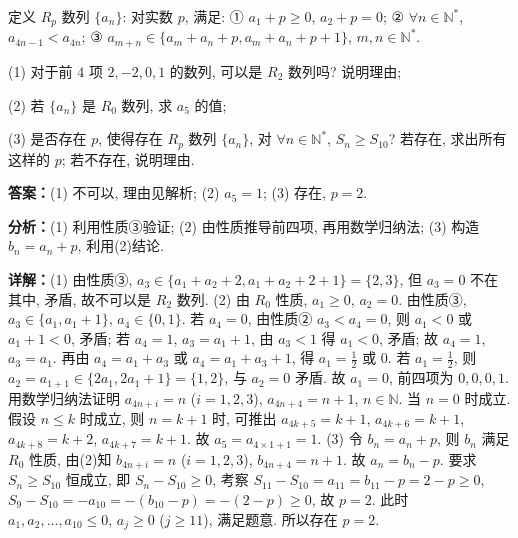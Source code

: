 \begin{question}[points=15]
定义 $R_p$ 数列 $\{a_n\}$: 对实数 $p$, 满足: ① $a_1+p\geq0$, $a_2+p=0$; ② $\forall n\in\mathbb{N}^*$, $a_{4n-1}<a_{4n}$; ③ $a_{m+n}\in\{a_m+a_n+p, a_m+a_n+p+1\}$, $m,n\in\mathbb{N}^*$.

(1) 对于前 $4$ 项 $2,-2,0,1$ 的数列, 可以是 $R_2$ 数列吗? 说明理由;

(2) 若 $\{a_n\}$ 是 $R_0$ 数列, 求 $a_5$ 的值;

(3) 是否存在 $p$, 使得存在 $R_p$ 数列 $\{a_n\}$, 对 $\forall n\in\mathbb{N}^*$, $S_n\geq S_{10}$? 若存在, 求出所有这样的 $p$; 若不存在, 说明理由.
\begin{solution}
\textbf{答案：}(1) 不可以, 理由见解析; (2) $a_5=1$; (3) 存在, $p=2$.

\textbf{分析：}(1) 利用性质③验证; (2) 由性质推导前四项, 再用数学归纳法; (3) 构造 $b_n=a_n+p$, 利用(2)结论.

\textbf{详解：}(1) 由性质③, $a_3\in\{a_1+a_2+2, a_1+a_2+2+1\}=\{2,3\}$, 但 $a_3=0$ 不在其中, 矛盾, 故不可以是 $R_2$ 数列.
(2) 由 $R_0$ 性质, $a_1\geq0$, $a_2=0$. 由性质③, $a_3\in\{a_1, a_1+1\}$, $a_4\in\{0,1\}$. 若 $a_4=0$, 由性质② $a_3<a_4=0$, 则 $a_1<0$ 或 $a_1+1<0$, 矛盾; 若 $a_4=1$, $a_3=a_1+1$, 由 $a_3<1$ 得 $a_1<0$, 矛盾; 故 $a_4=1$, $a_3=a_1$. 再由 $a_4=a_1+a_3$ 或 $a_4=a_1+a_3+1$, 得 $a_1=\frac{1}{2}$ 或 $0$. 若 $a_1=\frac{1}{2}$, 则 $a_2=a_{1+1}\in\{2a_1,2a_1+1\}=\{1,2\}$, 与 $a_2=0$ 矛盾. 故 $a_1=0$, 前四项为 $0,0,0,1$. 用数学归纳法证明 $a_{4n+i}=n$ ($i=1,2,3$), $a_{4n+4}=n+1$, $n\in\mathbb{N}$. 当 $n=0$ 时成立. 假设 $n\leq k$ 时成立, 则 $n=k+1$ 时, 可推出 $a_{4k+5}=k+1$, $a_{4k+6}=k+1$, $a_{4k+8}=k+2$, $a_{4k+7}=k+1$. 故 $a_5=a_{4\times1+1}=1$.
(3) 令 $b_n=a_n+p$, 则 $b_n$ 满足 $R_0$ 性质, 由(2)知 $b_{4n+i}=n$ ($i=1,2,3$), $b_{4n+4}=n+1$. 故 $a_n=b_n-p$. 要求 $S_n\geq S_{10}$ 恒成立, 即 $S_n-S_{10}\geq0$, 考察 $S_{11}-S_{10}=a_{11}=b_{11}-p=2-p\geq0$, $S_9-S_{10}=-a_{10}=-(b_{10}-p)=-(2-p)\geq0$, 故 $p=2$. 此时 $a_1,a_2,\ldots,a_{10}\leq0$, $a_j\geq0$ ($j\geq11$), 满足题意. 所以存在 $p=2$.
\end{solution}
\end{question}


